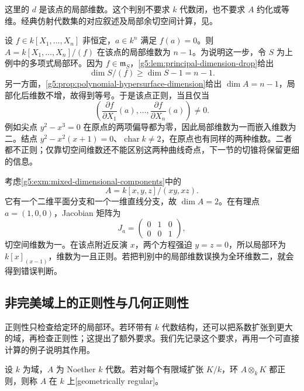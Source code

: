 这里的 \(d\) 是该点的局部维数。这个判别不要求 \(k\) 代数闭，也不要求 \(A\) 约化或等维。经典仿射代数集的对应叙述及局部余切空间计算，见\cite[第I章第5节，定理5.1，第31—32页]{Hartshorne1977}。

\begin{example}\label{g5:exm:hypersurface-rational-regularity}
	设 \(f\in k[X_1,\ldots,X_n]\) 非恒定，\(a\in k^n\) 满足 \(f(a)=0\)。则 \(A=k[X_1,\ldots,X_n]/(f)\) 在该点的局部维数为 \(n-1\)。为说明这一步，令 \(S\) 为上例中的多项式局部环。因为 \(f\in\mathfrak m_S\)，\cref{g5:lem:principal-dimension-drop}给出
	\[
		\dim S/(f)\geq\dim S-1=n-1.
	\]
	另一方面，\cref{g5:prop:polynomial-hypersurface-dimension}给出 \(\dim A=n-1\)，局部化后维数不增，故得到等号。于是该点正则，当且仅当
	\[
		\left(\frac{\partial f}{\partial X_1}(a),\ldots,
		\frac{\partial f}{\partial X_n}(a)\right)\ne0.
	\]
	例如尖点 \(y^2-x^3=0\) 在原点的两项偏导都为零，因此局部维数为一而嵌入维数为二。结点 \(y^2-x^2(x+1)=0\)、\(\operatorname{char}k\ne2\)，在原点也有同样的两种维数。二者都不正则；仅靠切空间维数还不能区别这两种曲线奇点，下一节的切锥将保留更细的信息。
\end{example}

\begin{example}\label{g5:exm:jacobian-local-dimension}
	考虑\cref{g5:exm:mixed-dimensional-components}中的
	\[
		A=k[x,y,z]/(xy,xz).
	\]
	它有一个二维平面分支和一个一维直线分支，故 \(\dim A=2\)。在有理点 \(a=(1,0,0)\)，Jacobian 矩阵为
	\[
		J_a=\begin{pmatrix}0&1&0\\0&0&1\end{pmatrix},
	\]
	切空间维数为一。在该点附近反演 \(x\)，两个方程强迫 \(y=z=0\)，所以局部环为 \(k[x]_{(x-1)}\)，维数为一且正则。若把判别中的局部维数误换为全环维数二，就会得到错误判断。
\end{example}

\subsection{非完美域上的正则性与几何正则性}
\label{g5:subsec:0503:05}

正则性只检查给定环的局部环。若环带有 \(k\) 代数结构，还可以把系数扩张到更大的域，再检查正则性；这提出了额外要求。我们先记录这个要求，再用一个可直接计算的例子说明其作用。

\begin{definition}\label{g5:def:geometrically-regular-algebra}
	设 \(k\) 为域，\(A\) 为 Noether \(k\) 代数。若对每个有限域扩张 \(K/k\)，环 \(A\otimes_kK\) 都正则，则称 \(A\) 在 \(k\) 上[geometrically regular]。
\end{definition}

